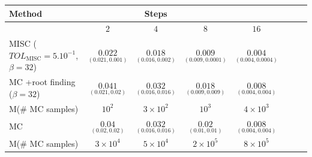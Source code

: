 \FloatBarrier
\begin{table}[h!]
	\centering
	\begin{tabular}{l*{6}{c}r}
		\toprule[1.5pt]
	Method & & Steps  & &     \\
	\hline
           & $2$ & $4$ & $8$ & $16$  \\
		\hline
		MISC ($TOL_{\text{MISC}}=5.10^{-1}$, $\beta=32$)  &  $\underset{(0.021,0.001)}{\mathbf{0.022}}$ & $\underset{(0.016,0.002)}{\mathbf{0.018}}$ & $\underset{(0.009,0.0001)}{\mathbf{0.009}}$ & $\underset{(0.004,0.0004)}{\mathbf{0.004}}$  \\
		
		\hline
		
			MC +root finding ($\beta=32$)  &  $\underset{(0.021,0.02)}{\mathbf{0.041}}$ & $\underset{(0.016,0.016)}{\mathbf{0.032}}$ & $\underset{(0.009,0.009)}{\mathbf{0.018}}$ & $\underset{(0.004,0.004)}{\mathbf{0.008}}$  \\
			M(\# MC samples)   & $10^2 $  & $3 \times 10^2 $  & $
			10^3$ & $4 \times 10^3$ \\	
		\hline	
				MC   &  $\underset{(0.02,0.02)}{\mathbf{0.04}}$ & $\underset{(0.016,0.016)}{\mathbf{0.032}}$ & $\underset{(0.01,0.01)}{\mathbf{}0.02}$ & $\underset{(0.004,0.004)}{\mathbf{0.008}}$  \\	
				M(\# MC samples)   & $3 \times 10^4$  & $5\times 10^4$  & $2\times 10^5$ & $8\times 10^5$ \\	
		

\end{tabular}
\end{table}
